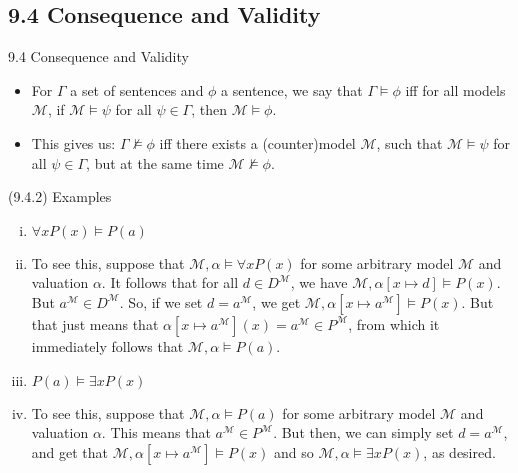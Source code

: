 \subsection{9.4 Consequence and Validity}

\begin{frame}{9.4 Consequence and Validity}

	\begin{itemize}%
	\itemsep=16pt
	
		\item For $\Gamma$ a set of sentences and $\phi$ a sentence, we say that $\Gamma\vDash\phi$ iff for all models $\mathcal{M}$, if $\mathcal{M}\vDash\psi$ for all $\psi\in\Gamma$, then $\mathcal{M}\vDash\phi$.
			
			\item This gives us: $\Gamma\nvDash\phi$ iff there exists a (counter)model $\mathcal{M}$, such that $\mathcal{M}\vDash\psi$ for all $\psi\in\Gamma$, but at the same time $\mathcal{M}\nvDash\phi$.
		
	\end{itemize}

\end{frame}

\begin{frame}{(9.4.2) Examples}

\begin{enumerate}[(i)]
\itemsep=16pt
		
		\item $\forall xP(x)\vDash P(a)$
		
		\item[] To see this, suppose that $\mathcal{M},\alpha\vDash\forall xP(x)$ for some arbitrary model $\mathcal{M}$ and valuation $\alpha$. It follows that for all $d\in D^\mathcal{M}$, we have $\mathcal{M},\alpha[x\mapsto d]\vDash P(x)$. But $a^\mathcal{M}\in D^\mathcal{M}$. So, if we set $d=a^\mathcal{M}$, we get $\mathcal{M},\alpha[x\mapsto a^\mathcal{M}]\vDash P(x)$. But that just means that $\alpha[x\mapsto a^\mathcal{M}](x)=a^\mathcal{M}\in P^\mathcal{M}$, from which it immediately follows that $\mathcal{M},\alpha\vDash P(a)$.
		
		\item $P(a)\vDash\exists xP(x)$
		
		\item[] To see this, suppose that $\mathcal{M},\alpha\vDash P(a)$ for some arbitrary model $\mathcal{M}$ and valuation $\alpha$. This means that $a^\mathcal{M}\in P^\mathcal{M}$. But then, we can simply set $d=a^\mathcal{M}$, and get that $\mathcal{M},\alpha[x\mapsto a^\mathcal{M}]\vDash P(x)$ and so $\mathcal{M},\alpha\vDash\exists xP(x)$, as desired.

\end{enumerate}

\end{frame}

